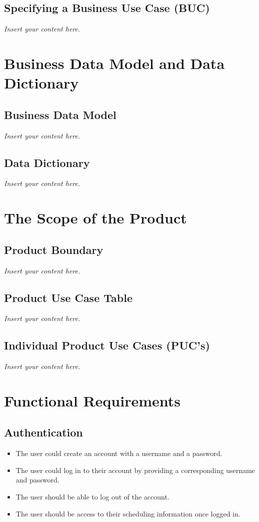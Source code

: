 \documentclass[12pt]{article}
\newcommand{\lips}{\textit{Insert your content here.}}
\newcounter{reqnum} %
\newcommand{\rthereqnum}{FR\refstepcounter{reqnum}\thereqnum:}
\begin{document}
\subsection{Specifying a Business Use Case (BUC)}
\lips

\section{Business Data Model and Data Dictionary}
\subsection{Business Data Model}
\lips
\subsection{Data Dictionary}
\lips

\section{The Scope of the Product}
\subsection{Product Boundary}
\lips
\subsection{Product Use Case Table}
\lips
\subsection{Individual Product Use Cases (PUC's)}
\lips

\section{Functional Requirements}
\subsection{Authentication}
\begin{itemize}

\item[\rthereqnum]
The user could create an account with a username and a password.
\item[\rthereqnum]
The user could log in to their account by providing a corresponding username and password.
\item[\rthereqnum]
The user should be able to log out of the account.
\item[\rthereqnum]
The user should be access to their scheduling information once logged in.

\end{itemize}
\end{document}
